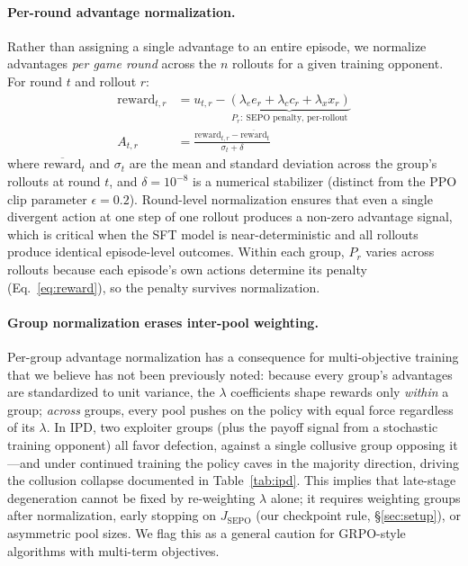 \documentclass[letterpaper]{article} %
\newcommand{\Jsepo}{J_{\text{SEPO}}}
\begin{document}
\paragraph{Per-round advantage normalization.}
Rather than assigning a single advantage to an entire episode, we normalize advantages \emph{per game round} across the $n$ rollouts for a given training opponent. For round $t$ and rollout $r$:
\begin{align}
\text{reward}_{t,r} &= u_{t,r} - \underbrace{(\lambda_e e_r + \lambda_c c_r + \lambda_x x_r)}_{P_r:\ \text{SEPO penalty, per-rollout}} \label{eq:round_reward}\\
A_{t,r} &= \frac{\text{reward}_{t,r} - \overline{\text{reward}}_{t}}{\sigma_t + \delta} \label{eq:advantage}
\end{align}
where $\overline{\text{reward}}_t$ and $\sigma_t$ are the mean and standard deviation across the group's rollouts at round $t$, and $\delta = 10^{-8}$ is a numerical stabilizer (distinct from the PPO clip parameter $\epsilon = 0.2$). Round-level normalization ensures that even a single divergent action at one step of one rollout produces a non-zero advantage signal, which is critical when the SFT model is near-deterministic and all rollouts produce identical episode-level outcomes. Within each group, $P_r$ varies across rollouts because each episode's own actions determine its penalty (Eq.~\ref{eq:reward}), so the penalty survives normalization.
\paragraph{Group normalization erases inter-pool weighting.} Per-group advantage normalization has a consequence for multi-objective training that we believe has not been previously noted: because every group's advantages are standardized to unit variance, the $\lambda$ coefficients shape rewards only \emph{within} a group; \emph{across} groups, every pool pushes on the policy with equal force regardless of its $\lambda$. In IPD, two exploiter groups (plus the payoff signal from a stochastic training opponent) all favor defection, against a single collusive group opposing it---and under continued training the policy caves in the majority direction, driving the collusion collapse documented in Table~\ref{tab:ipd}. This implies that late-stage degeneration cannot be fixed by re-weighting $\lambda$ alone; it requires weighting groups after normalization, early stopping on $\Jsepo$ (our checkpoint rule, \S\ref{sec:setup}), or asymmetric pool sizes. We flag this as a general caution for GRPO-style algorithms with multi-term objectives.
\end{document}
